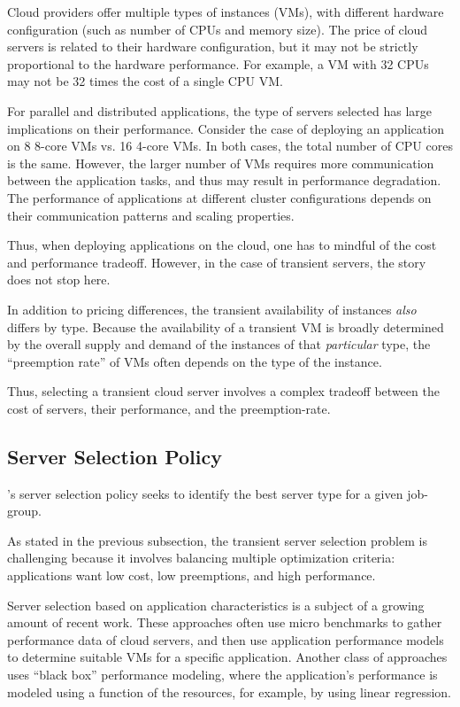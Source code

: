 Cloud providers offer multiple types of instances (VMs), with different hardware configuration (such as number of CPUs and memory size).
The price of cloud servers is related to their hardware configuration, but it may not be strictly proportional to the hardware performance.
For example, a VM with 32 CPUs may not be 32 times the cost of a single CPU VM.


For parallel and distributed applications, the type of servers selected has large implications on their performance.
Consider the case of deploying an application on 8 8-core VMs vs. 16 4-core VMs.
In both cases, the total number of CPU cores is the same.
However, the larger number of VMs requires more communication between the application tasks, and thus may result in performance degradation.
The performance of applications at different cluster configurations depends on their communication patterns and scaling properties. 



Thus, when deploying applications on the cloud, one has to mindful of the cost and performance tradeoff.
However, in the case of transient servers, the story does not stop here. 


In addition to pricing differences, the transient availability of instances \emph{also} differs by type.
Because the availability of a transient VM is broadly determined by the overall supply and demand of the instances of that \emph{particular} type, the ``preemption rate'' of VMs often depends on the type of the instance.



Thus, selecting a transient cloud server involves a complex tradeoff between the cost of servers, their performance, and the preemption-rate.


\subsection{Server Selection Policy}

\sysname's server selection policy seeks to identify the best server type for a given job-group.

As stated in the previous subsection, the transient server selection problem is challenging because it involves balancing multiple optimization criteria: applications want low cost, low preemptions, and high performance.

Server selection based on application characteristics is a subject of a growing amount of recent work.
These approaches often use micro benchmarks to gather performance data of cloud servers, and then use application performance models to determine suitable VMs for a specific application.
Another class of approaches uses ``black box'' performance modeling, where the application's performance is modeled using a function of the resources, for example, by using linear regression.

